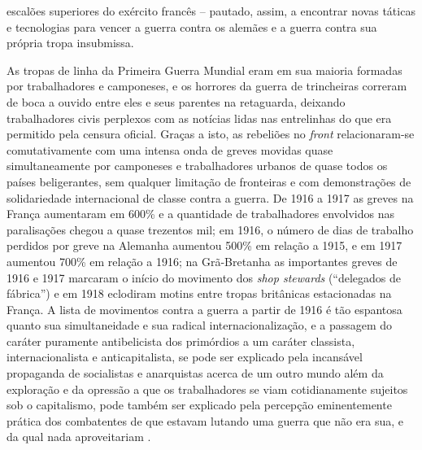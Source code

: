 escalões superiores do exército francês -- pautado, assim, a encontrar novas táticas e tecnologias para vencer a guerra contra os alemães e a guerra contra sua própria tropa insubmissa. 

As tropas de linha da Primeira Guerra Mundial eram em sua maioria formadas por trabalhadores e camponeses, e os horrores da guerra de trincheiras correram de boca a ouvido entre eles e seus parentes na retaguarda, deixando trabalhadores civis perplexos com as notícias lidas nas entrelinhas do que era permitido pela censura oficial. Graças a isto, as rebeliões no \textit{front} relacionaram-se comutativamente com uma intensa onda de greves movidas quase simultaneamente por camponeses e trabalhadores urbanos de quase todos os países beligerantes, sem qualquer limitação de fronteiras e com demonstrações de solidariedade internacional de classe contra a guerra. De 1916 a 1917 as greves na França aumentaram em 600\% e a quantidade de trabalhadores envolvidos nas paralisações chegou a quase trezentos mil; em 1916, o número de dias de trabalho perdidos por greve na Alemanha aumentou 500\% em relação a 1915, e em 1917 aumentou 700\% em relação a 1916; na Grã-Bretanha as importantes greves de 1916 e 1917 marcaram o início do movimento dos \textit{shop stewards} (``delegados de fábrica'') e em 1918 eclodiram motins entre tropas britânicas estacionadas na França. A lista de movimentos contra a guerra a partir de 1916 é tão espantosa quanto sua simultaneidade e sua radical internacionalização, e a passagem do caráter puramente antibelicista dos primórdios a um caráter classista, internacionalista e anticapitalista, se pode ser explicado pela incansável propaganda de socialistas e anarquistas acerca de um outro mundo além da exploração e da opressão a que os trabalhadores se viam cotidianamente sujeitos sob o capitalismo, pode também ser explicado pela percepção eminentemente prática dos combatentes de que estavam lutando uma guerra que não era sua, e da qual nada aproveitariam \cite[p.~232-251]{bernardo_fascismo_2015}.

